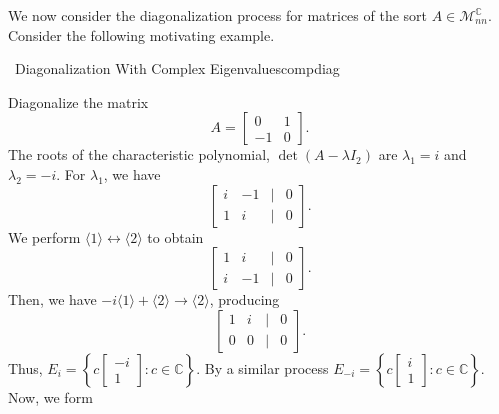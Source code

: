         We now consider the diagonalization process for matrices of the sort \(A\in\mathcal{M}_{nn}^\mathbb{C}\). Consider the following motivating example.
        \begin{example}{\Difficulty\,\Difficulty\,\,Diagonalization With Complex Eigenvalues}{compdiag}

            Diagonalize the matrix
            \begin{equation*}
                A=\begin{bmatrix}
                    0 & 1 \\
                     -1 & 0
                \end{bmatrix}.
            \end{equation*}
            The roots of the characteristic polynomial, \(\det(A-\lambda I_2)\) are \(\lambda_1=i\) and \(\lambda_2=-i\). For \(\lambda_1\), we have
            \begin{equation*}
                \begin{bmatrix}
                    i & -1 & | & 0 \\
                    1 & i & | & 0
                \end{bmatrix}.
            \end{equation*}
            We perform \(\langle1\rangle\leftrightarrow\langle2\rangle\) to obtain
            \begin{equation*}
                \begin{bmatrix}
                    1 & i & | & 0 \\
                    i & -1 & | & 0
                \end{bmatrix}.
            \end{equation*}
            Then, we have \(-i\langle1\rangle+\langle2\rangle\to\langle2\rangle\), producing
            \begin{equation*}
                \begin{bmatrix}
                    1 & i & | & 0 \\
                    0 & 0 & | & 0
                \end{bmatrix}.
            \end{equation*}
            Thus, \(E_i=\left\{c\begin{bmatrix} -i \\ 1 \end{bmatrix}:c\in\mathbb{C}\right\}\). By a similar process \(E_{-i}=\left\{c\begin{bmatrix} i \\ 1\end{bmatrix}:c\in\mathbb{C}\right\}\). Now, we form

\end{example}
